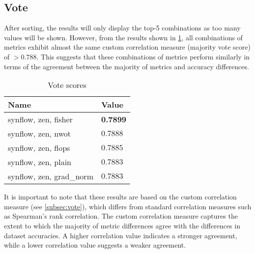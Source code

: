 
\subsection{Vote}




After sorting, the results will only display the top-5 combinations as too many values will be shown. However, from the results shown in \cref{tab:vote}, all combinations of metrics exhibit almost the same custom correlation measure (majority vote score) of $ > 0.788$. This suggests that these combinations of metrics perform similarly in terms of the agreement between the majority of metrics and accuracy differences.

\begin{table}[h!]
\caption{Vote scores}
\centering
\begin{tabular}{ll}
\textbf{Name} & \textbf{Value} \\ \hline
\multicolumn{1}{l|}{synflow, zen, fisher} & \textbf{0.7899} \\
\multicolumn{1}{l|}{\cellcolor{verylightgray}synflow, zen, nwot} & \cellcolor{verylightgray}$0.7888$ \\
\multicolumn{1}{l|}{synflow, zen, flops} & $0.7885$ \\
\multicolumn{1}{l|}{\cellcolor{verylightgray}synflow, zen, plain} & \cellcolor{verylightgray}$0.7883$ \\
\multicolumn{1}{l|}{synflow, zen, grad\_norm} & $0.7883$ \\
\end{tabular}
\label{tab:vote}
\end{table}

It is important to note that these results are based on the custom correlation measure (see \cref{subsec:vote}), which differs from standard correlation measures such as Spearman's rank correlation. The custom correlation measure captures the extent to which the majority of metric differences agree with the differences in dataset accuracies. A higher correlation value indicates a stronger agreement, while a lower correlation value suggests a weaker agreement.
